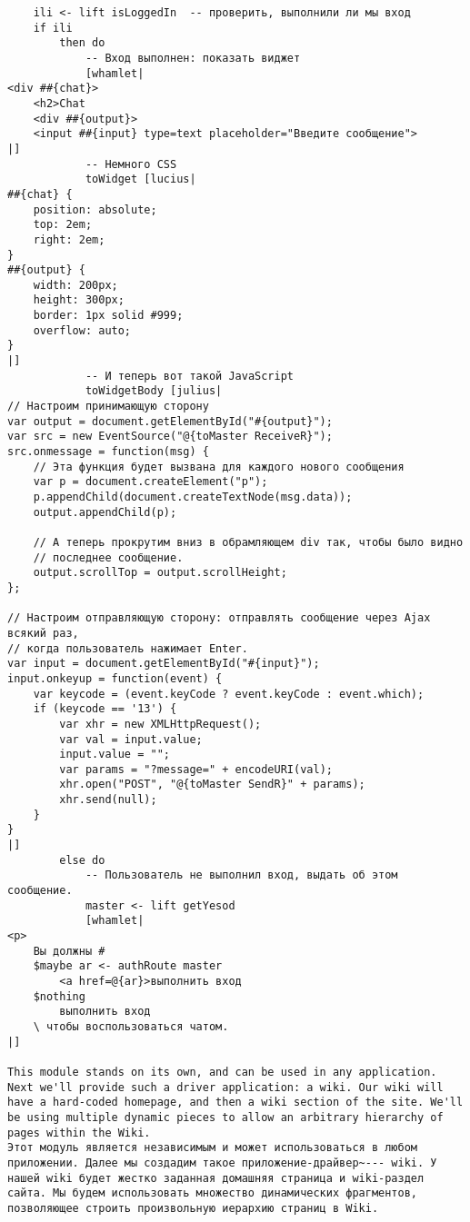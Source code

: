 \begin{lstlisting}
    ili <- lift isLoggedIn  -- проверить, выполнили ли мы вход
    if ili
        then do
            -- Вход выполнен: показать виджет
            [whamlet|
<div ##{chat}>
    <h2>Chat
    <div ##{output}>
    <input ##{input} type=text placeholder="Введите сообщение">
|]
            -- Немного CSS
            toWidget [lucius|
##{chat} {
    position: absolute;
    top: 2em;
    right: 2em;
}
##{output} {
    width: 200px;
    height: 300px;
    border: 1px solid #999;
    overflow: auto;
}
|]
            -- И теперь вот такой JavaScript
            toWidgetBody [julius|
// Настроим принимающую сторону
var output = document.getElementById("#{output}");
var src = new EventSource("@{toMaster ReceiveR}");
src.onmessage = function(msg) {
    // Эта функция будет вызвана для каждого нового сообщения
    var p = document.createElement("p");
    p.appendChild(document.createTextNode(msg.data));
    output.appendChild(p);

    // А теперь прокрутим вниз в обрамляющем div так, чтобы было видно
    // последнее сообщение.
    output.scrollTop = output.scrollHeight;
};

// Настроим отправляющую сторону: отправлять сообщение через Ajax всякий раз,
// когда пользователь нажимает Enter.
var input = document.getElementById("#{input}");
input.onkeyup = function(event) {
    var keycode = (event.keyCode ? event.keyCode : event.which);
    if (keycode == '13') {
        var xhr = new XMLHttpRequest();
        var val = input.value;
        input.value = "";
        var params = "?message=" + encodeURI(val);
        xhr.open("POST", "@{toMaster SendR}" + params);
        xhr.send(null);
    }
}
|]
        else do
            -- Пользователь не выполнил вход, выдать об этом сообщение.
            master <- lift getYesod
            [whamlet|
<p>
    Вы должны #
    $maybe ar <- authRoute master
        <a href=@{ar}>выполнить вход
    $nothing
        выполнить вход
    \ чтобы воспользоваться чатом.
|]

This module stands on its own, and can be used in any application. Next we'll provide such a driver application: a wiki. Our wiki will have a hard-coded homepage, and then a wiki section of the site. We'll be using multiple dynamic pieces to allow an arbitrary hierarchy of pages within the Wiki.
Этот модуль является независимым и может использоваться в любом приложении. Далее мы создадим такое приложение-драйвер~--- wiki. У нашей wiki будет жестко заданная домашняя страница и wiki-раздел сайта. Мы будем использовать множество динамических фрагментов, позволяющее строить произвольную иерархию страниц в Wiki.


\end{lstlisting}
